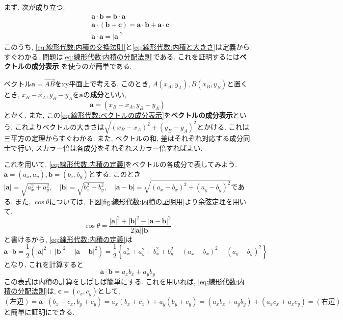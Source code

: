         まず, 次が成り立つ.
        \begin{align}
            &\bm{a}\cdot\bm{b}=\bm{b}\cdot\bm{a} \label{eq:線形代数:内積の交換法則}\\
            &\bm{a}\cdot(\bm{b}+\bm{c})=\bm{a}\cdot\bm{b}+\bm{a}\cdot\bm{c} \label{eq:線形代数:内積の分配法則}\\
            &\bm{a}\cdot\bm{a}=|\bm{a}|^2 \label{eq:線形代数:内積と大きさ}
        \end{align}
        このうち, \eqref{eq:線形代数:内積の交換法則}と\eqref{eq:線形代数:内積と大きさ}は定義からすぐわかる. 問題は\eqref{eq:線形代数:内積の分配法則}である. これを証明するには\textbf{ベクトルの成分表示}
        を使うのが簡単である.

        ベクトル$\bm{a}=\overrightarrow{AB}$をxy平面上で考える. このとき, $A(x_A,y_A),B(x_B,y_B)$と置くとき, $x_B-x_A,y_B-y_A$を$\bm{a}$の\textbf{成分}といい, 
        \begin{equation}
            \bm{a}=(x_B-x_A,y_B-y_A) \label{eq:線形代数:ベクトルの成分表示}
        \end{equation}
        とかく. また, この\eqref{eq:線形代数:ベクトルの成分表示}を\textbf{ベクトルの成分表示}という. これよりベクトルの大きさは$\sqrt{(x_B-x_A)^2+(y_B-y_A)^2}$とかける. これは三平方の定理からすぐわかる.
        また, ベクトルの和, 差はそれぞれ対応する成分同士で行い, スカラー倍は各成分をそれぞれスカラー倍すればよい.

        これを用いて, \eqref{eq:線形代数:内積の定義}をベクトルの各成分で表してみよう. $\bm{a}=(a_x,a_y),\bm{b}=(b_x,b_y)$とする.
        このとき$|\bm{a}|=\sqrt{a_x^2+a_y^2},\quad|\bm{b}|=\sqrt{b_x^2+b_y^2},\quad |\bm{a}-\bm{b}|=\sqrt{(a_x-b_x)^2+(a_y-b_y)^2}$である.
        \clearpage
        また, $\cos\theta$については, 下図\ref{fig:線形代数:内積の証明用}より余弦定理を用いて, 
        \begin{equation*}
            \cos\theta = \frac{|\bm{a}|^2+|\bm{b}|^2-|\bm{a}-\bm{b}|^2}{2|\bm{a}||\bm{b}|}
        \end{equation*}
        と書けるから, \eqref{eq:線形代数:内積の定義}は
        \begin{equation*}
            \bm{a}\cdot\bm{b}=\frac{1}{2}\left(|\bm{a}|^2+|\bm{b}|^2-|\bm{a}-\bm{b}|^2\right)=\frac{1}{2}\left\{a_x^2+a_y^2+b_x^2+b_y^2-(a_x-b_x)^2+(a_y-b_y)^2\right\}
        \end{equation*}
        となり, これを計算すると
        \begin{equation}
            \bm{a}\cdot\bm{b}=a_xb_x+a_yb_y \label{eq:線形代数:内積の成分表示}
        \end{equation}
        この表式は内積の計算をしばしば簡単にする. これを用いれば, \eqref{eq:線形代数:内積の分配法則}は, $\bm{c}=(c_x,c_y)$として, 
        \begin{equation*}
            (左辺)=\bm{a}\cdot (b_x+c_x,b_y+c_y)=a_x(b_x+c_x)+a_y(b_y+c_y)=(a_xb_x+a_yb_y)+(a_xc_x+a_xc_y)=(右辺)
        \end{equation*}
        と簡単に証明にできる.

